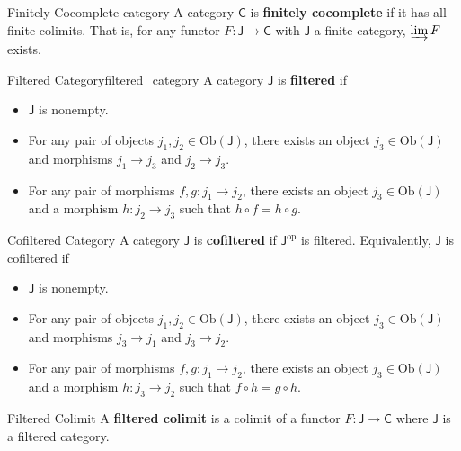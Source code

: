 \begin{definition}{Finitely Cocomplete category}{}
    A category $\mathsf{C}$ is \textbf{finitely cocomplete} if it has all finite colimits. That is, for any functor $F:\mathsf{J}\to \mathsf{C}$ with $\mathsf{J}$ a finite category, $\varinjlim F$ exists.
\end{definition}



\begin{definition}{Filtered Category}{filtered_category}
    A category $\mathsf{J}$ is \textbf{filtered} if 
    \begin{itemize}
        \item $\mathsf{J}$ is nonempty.
        \item For any pair of objects $j_1,j_2\in \mathrm{Ob}(\mathsf{J})$, there exists an object $j_3\in \mathrm{Ob}(\mathsf{J})$ and morphisms $j_1\to j_3$ and $j_2\to j_3$.
        \item For any pair of morphisms $f,g:j_1\to j_2$, there exists an object $j_3\in \mathrm{Ob}(\mathsf{J})$ and a morphism $h:j_2\to j_3$ such that $h\circ f=h\circ g$.
    \end{itemize}
\end{definition}

\begin{definition}{Cofiltered Category}{}
    A category $\mathsf{J}$ is \textbf{cofiltered} if $\mathsf{J}^{\mathrm{op}}$ is filtered. Equivalently, $\mathsf{J}$ is cofiltered if
    \begin{itemize}
        \item $\mathsf{J}$ is nonempty.
        \item For any pair of objects $j_1,j_2\in \mathrm{Ob}(\mathsf{J})$, there exists an object $j_3\in \mathrm{Ob}(\mathsf{J})$ and morphisms $j_3\to j_1$ and $j_3\to j_2$.
        \item For any pair of morphisms $f,g:j_1\to j_2$, there exists an object $j_3\in \mathrm{Ob}(\mathsf{J})$ and a morphism $h:j_3\to j_2$ such that $f\circ h=g\circ h$.
    \end{itemize}
\end{definition}

\begin{definition}{Filtered Colimit}{}
    A \textbf{filtered colimit} is a colimit of a functor $F: \mathsf{J} \rightarrow \mathsf{C}$ where $\mathsf{J}$ is a filtered category.
\end{definition}


